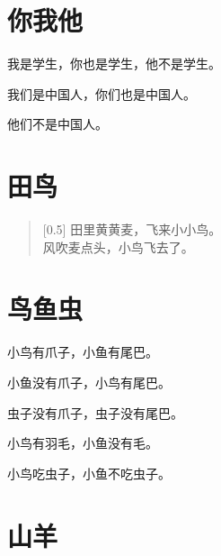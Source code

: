 \documentclass[12pt,UTF-8,openany]{ctexbook}
\begin{document}
\chapter{你我他}

\begin{large}
    
    我是学生，你也是学生，他不是学生。
    
    我们是中国人，你们也是中国人。
    
    他们不是中国人。
    
\end{large}





\chapter{田鸟}

\begin{large}
    
    \begin{verse}[0.5\linewidth]
        田里黄黄麦，飞来小小鸟。 \\
        风吹麦点头，小鸟飞去了。
    \end{verse}
    
\end{large}





\chapter{鸟鱼虫}

\begin{large}
    
    小鸟有爪子，小鱼有尾巴。
    
    小鱼没有爪子，小鸟有尾巴。
    
    虫子没有爪子，虫子没有尾巴。
    
    小鸟有羽毛，小鱼没有毛。
    
    小鸟吃虫子，小鱼不吃虫子。
    
\end{large}





\chapter{山羊}
\end{document}
